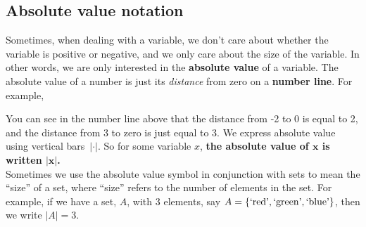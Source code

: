 \subsection{Absolute value notation} \label{number line}
Sometimes, when dealing with a variable, we don't care about whether the variable is positive or negative, and we only care about the size of the variable. In other words, we are only interested in the \textbf{absolute value} of a variable. The absolute value of a number is just its \textit{distance} from zero on a \textbf{number line}. For example,
\begin{center}
\end{center}
You can see in the number line above that the distance from -2 to 0 is equal to 2, and the distance from 3 to zero is just equal to 3. 
We express absolute value using vertical bars~$|\cdot|$. So for some variable $x$, \textbf{the absolute value of $\boldsymbol{x}$ is written $\boldsymbol{|x|}$.} \label{symb||} \label{absolute value} \\

\noindent Sometimes we use the absolute value symbol in conjunction with sets to mean the ``size'' of a set, where ``size'' refers to the number of elements in the set. For example, if we have a set, $A$, with 3 elements, say $A = \left\{\text{`red'},\text{`green'},\text{`blue'}\right\}$, then we write $|A| = 3.$

